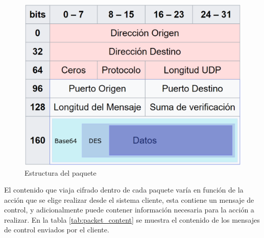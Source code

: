 \documentclass[12pt, twoside]{article}
\begin{document}
            \begin{figure}[h!]
            \centering
                \includegraphics[scale=0.4]{ip_packet.eps}
                \caption{Estructura del paquete}
                \label{fig:ip_packet}
            \end{figure}

            El contenido que viaja cifrado dentro de cada paquete varía en función de la acción que se elige realizar desde el sistema cliente, esta contiene un mensaje de control, y adicionalmente puede contener información necesaria para la acción a realizar. En la tabla \ref{tab:packet_content} se muestra el contenido de los mensajes de control enviados por el cliente.
\end{document}
